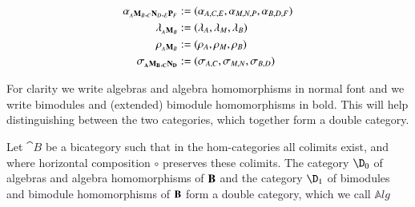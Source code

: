 \documentclass{amsart}
\newcommand{\Alg}{\mathbb{A}\mathit{lg}}
\newcommand{\hor}{\circ}
\begin{document}
\begin{align}
 {\bf \alpha}_{_A{\bf M}_B,_C{\bf N}_D,_E{\bf P}_F} &:= (\alpha_{A,C,E}, \alpha_{M,N,P}, \alpha_{B,D,F}) 
\\{\bf \lambda}_{_A{\bf M}_B}&:= (\lambda_A, \lambda_M, \lambda_B)
\\{\bf \rho}_{_A{\bf M}_B} &:= (\rho_A, \rho_M, \rho_B)
\\{\bf \sigma}_{\bf {}_AM_B,{}_CN_D}&: = (\sigma_{A,C}, \sigma_{M,N}, \sigma_{B,D})
\end{align}

For clarity we write algebras and algebra homomorphisms in normal font and we write bimodules and (extended) bimodule homomorphisms in bold. This will help distinguishing between the two categories, which together form a double category.

\begin{lem}\label{lem:algdouble}
Let ${\cat B}$ be a bicategory such that in the hom-categories all colimits exist, and where horizontal composition $\hor$ preserves these colimits. The category $\D_0$ of algebras and algebra homomorphisms of ${\bf B}$ and the category $\D_1$ of bimodules and bimodule homomorphisms of ${\bf B}$ form a double category, which we call $\Alg$
\end{lem}
\end{document}
